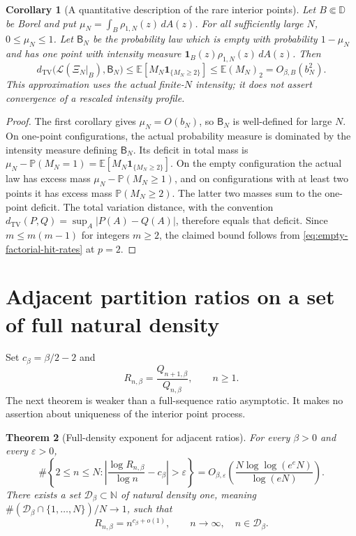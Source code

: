 \documentclass[11pt,a4paper]{article}
\numberwithin{equation}{section}
\newtheorem{theorem}{Theorem}[section]
\newtheorem{corollary}[theorem]{Corollary}
\theoremstyle{definition}
\theoremstyle{remark}
\newcommand{\D}{\mathbb D}
\begin{document}
\begin{corollary}[A quantitative description of the rare interior points]
\label{cor:empty-bernoulli-approximation}
Let $B\Subset\D$ be Borel and put
$\mu_N=\int_B\rho_{1,N}(z)\,dA(z)$. For all sufficiently large $N$,
$0\leq\mu_N\leq1$. Let $\mathsf B_N$ be the probability law which is
empty with probability $1-\mu_N$ and has one point with intensity measure
$\mathbf1_B(z)\rho_{1,N}(z)\,dA(z)$. Then
\[
 d_{\mathrm{TV}}\bigl(\mathcal L(\Xi_N|_B),\mathsf B_N\bigr)
 \leq\mathbb E[M_N\mathbf1_{\{M_N\geq2\}}]
 \leq\mathbb E(M_N)_2=O_{\beta,B}(b_N^2).
\]
This approximation uses the actual finite-$N$ intensity; it does not
assert convergence of a rescaled intensity profile.
\end{corollary}

\begin{proof}
The first corollary gives $\mu_N=O(b_N)$, so $\mathsf B_N$ is well-defined
for large $N$. On one-point configurations, the actual probability
measure is dominated by the intensity measure defining $\mathsf B_N$.
Its deficit in total mass is
$\mu_N-\mathbb P(M_N=1)=\mathbb E[M_N\mathbf1_{\{M_N\geq2\}}]$.
On the empty configuration the actual law has excess mass
$\mu_N-\mathbb P(M_N\geq1)$, and on configurations with at least two
points it has excess mass $\mathbb P(M_N\geq2)$. The latter two masses
sum to the one-point deficit. The total variation distance, with the
convention $d_{\mathrm{TV}}(P,Q)=\sup_A|P(A)-Q(A)|$, therefore equals
that deficit. Since $m\leq m(m-1)$ for integers $m\geq2$, the claimed
bound follows from \eqref{eq:empty-factorial-hit-rates} at $p=2$.
\end{proof}

\section{Adjacent partition ratios on a set of full natural density}
\label{sec:partition-density-one}

Set $c_\beta=\beta/2-2$ and
\[
 R_{n,\beta}=\frac{Q_{n+1,\beta}}{Q_{n,\beta}},\qquad n\geq1.
\]
The next theorem is weaker than a full-sequence ratio asymptotic.
It makes no assertion about uniqueness of the interior point process.

\begin{theorem}[Full-density exponent for adjacent ratios]
\label{thm:partition-ratio-density-one}
For every $\beta>0$ and every $\varepsilon>0$,
\begin{equation}
 \#\left\{2\leq n\leq N:
 \left|\frac{\log R_{n,\beta}}{\log n}-c_\beta\right|>\varepsilon
 \right\}
 =O_{\beta,\varepsilon}\left(
                   \frac{N\log\log(e^eN)}{\log(eN)}\right).
 \label{eq:partition-ratio-density-exceptions}
\end{equation}
There exists a set $\mathcal D_\beta\subset\mathbb N$ of natural density
one, meaning
$\#(\mathcal D_\beta\cap\{1,\ldots,N\})/N\to1$, such that
\begin{equation}
 R_{n,\beta}=n^{c_\beta+o(1)},
 \qquad n\to\infty,\quad n\in\mathcal D_\beta.
 \label{eq:partition-ratio-density-one}
\end{equation}
\end{theorem}
\end{document}
